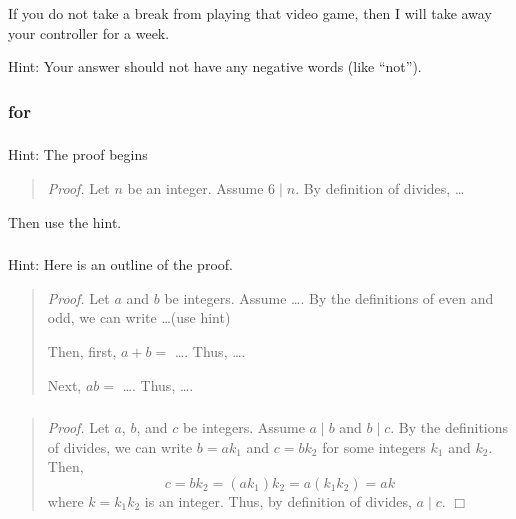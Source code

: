 \subsubsection*{ \answers}
\begin{apart}
    \item If you do not take a break from playing that video game, then I will take away your controller for a week.
    \item Hint: Your answer should not have any negative words (like ``not'').
\end{apart}

\subsubsection{\answers for  \subpffifthen}

\subsubsection*{ \answers}
Hint: The proof begins
    \begin{quote}
        \emph{Proof.}  Let $n$ be an integer.  Assume $6 \mid n$.  By definition of divides, \ldots
    \end{quote}
Then use the hint.

\subsubsection*{ \answers}
 Hint: Here is an outline of the proof.
     \begin{quote}
        \emph{Proof.}  Let $a$ and $b$ be integers.  Assume \ldots. 
        By the definitions of even and odd, we can write \ldots (use hint)

        Then, first, $a+b=$ \ldots. Thus, \ldots.

        Next, $ab = $ \ldots. Thus, \ldots.
     \end{quote}

\subsubsection*{ \answers}
     \begin{quote}
        \emph{Proof.}  Let $a$, $b$, and $c$ be integers.  Assume $a \mid b$ and $b \mid c$. By the definitions of divides, we can write $b=ak_1$ and $c=bk_2$ for some integers $k_1$ and $k_2$. Then, $$c = bk_2 = (ak_1)k_2 = a(k_1k_2) = ak$$
        where $k = k_1k_2$ is an integer.  Thus, by definition of divides, $a \mid c$. \hfill $\Box$
     \end{quote}

